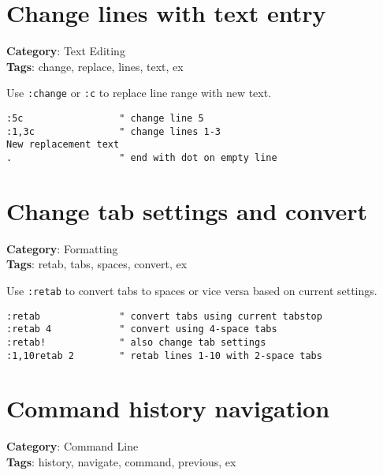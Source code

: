 {{{{{\section{Change lines with text entry}

\textbf{Category}: Text Editing\\ \textbf{Tags}: change, replace, lines, text, ex
\vspace{0.5cm}

Use {\footnotesize \Verb§:change§} or {\footnotesize \Verb§:c§} to replace line range with new text.

\begin{Exa*}{}
\begin{Verbatim}[fontsize=\footnotesize, breaklines, breakanywhere]
:5c                 " change line 5
:1,3c               " change lines 1-3
New replacement text
.                   " end with dot on empty line
\end{Verbatim}
\end{Exa*}

\section{Change tab settings and convert}

\textbf{Category}: Formatting\\ \textbf{Tags}: retab, tabs, spaces, convert, ex
\vspace{0.5cm}

Use {\footnotesize \Verb§:retab§} to convert tabs to spaces or vice versa based on current settings.

\begin{Exa*}{}
\begin{Verbatim}[fontsize=\footnotesize, breaklines, breakanywhere]
:retab              " convert tabs using current tabstop
:retab 4            " convert using 4-space tabs
:retab!             " also change tab settings
:1,10retab 2        " retab lines 1-10 with 2-space tabs
\end{Verbatim}
\end{Exa*}

\section{Command history navigation}

\textbf{Category}: Command Line\\ \textbf{Tags}: history, navigate, command, previous, ex
\vspace{0.5cm}

}}}}}
